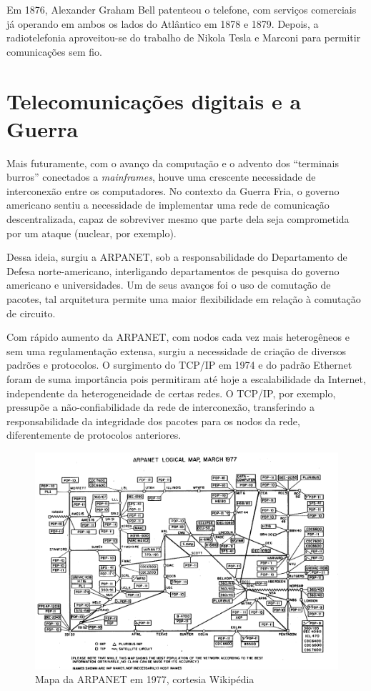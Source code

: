 \documentclass[brazil,times]{abnt}
\begin{document}
Em 1876, Alexander Graham Bell patenteou o telefone, com serviços comerciais já
operando em ambos os lados do Atlântico em 1878 e 1879. Depois, a radiotelefonia
aproveitou-se do trabalho de Nikola Tesla e Marconi para permitir comunicações
sem fio.

\section{Telecomunicações digitais e a Guerra}
Mais futuramente, com o avanço da computação e o advento dos ``terminais
burros'' conectados a \emph{mainframes}, houve uma crescente necessidade de
interconexão entre os computadores. No contexto da Guerra Fria, o governo
americano sentiu a necessidade de implementar uma rede de comunicação
descentralizada, capaz de sobreviver mesmo que parte dela seja comprometida por
um ataque (nuclear, por exemplo).

Dessa ideia, surgiu a ARPANET, sob a responsabilidade do Departamento de Defesa
norte-americano, interligando departamentos de pesquisa do governo americano e
universidades. Um de seus avanços foi o uso de comutação de pacotes, tal
arquitetura permite uma maior flexibilidade em relação à comutação de circuito.

Com rápido aumento da ARPANET, com nodos cada vez mais heterogêneos e sem uma
regulamentação extensa, surgiu a necessidade de criação de diversos padrões e
protocolos. O surgimento do TCP/IP em 1974 e do padrão Ethernet foram de suma
importância pois permitiram até hoje a escalabilidade da Internet, independente
da heterogeneidade de certas redes. O TCP/IP, por exemplo, pressupõe a
não-confiabilidade da rede de interconexão, transferindo a responsabilidade da
integridade dos pacotes para os nodos da rede, diferentemente de protocolos
anteriores. \cite{wiki:arpanet}

\begin{figure}[htp]
\begin{center}
  \includegraphics[width=150mm]{imagens/Arpanet_logical_map,_march_1977.png}
  \caption[Mapa da ARPANET em 1977, cortesia Wikipédia]{Mapa da ARPANET em 1977,
  cortesia Wikipédia}
  \label{fig:arpanet}
\end{center}
\end{figure}
\end{document}
